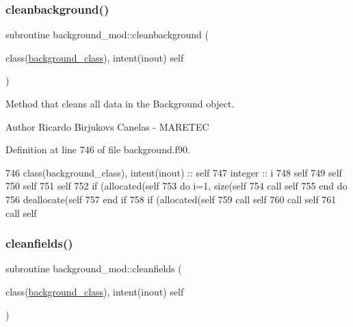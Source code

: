 \subsubsection{\texorpdfstring{cleanbackground()}{cleanbackground()}}
{\footnotesize\ttfamily subroutine background\+\_\+mod\+::cleanbackground (\begin{DoxyParamCaption}\item[{class(\mbox{\hyperlink{structbackground__mod_1_1background__class}{background\+\_\+class}}), intent(inout)}]{self }\end{DoxyParamCaption})\hspace{0.3cm}{\ttfamily [private]}}



Method that cleans all data in the Background object. 

\begin{DoxyAuthor}{Author}
Ricardo Birjukovs Canelas -\/ M\+A\+R\+E\+T\+EC 
\end{DoxyAuthor}


Definition at line 746 of file background.\+f90.


\begin{DoxyCode}
746     \textcolor{keywordtype}{class}(background\_class), \textcolor{keywordtype}{intent(inout)} :: self
747     \textcolor{keywordtype}{integer} :: i
748     self%
749     self%
750     self%
751     self%
752     \textcolor{keywordflow}{if} (\textcolor{keyword}{allocated}(self%
753         \textcolor{keywordflow}{do} i=1, \textcolor{keyword}{size}(self%
754             \textcolor{keyword}{call }self%
755 \textcolor{keywordflow}{        end do}
756         \textcolor{keyword}{deallocate}(self%
757 \textcolor{keywordflow}{    end if}
758     \textcolor{keywordflow}{if} (\textcolor{keyword}{allocated}(self%
759     \textcolor{keyword}{call }self%
760     \textcolor{keyword}{call }self%
761     \textcolor{keyword}{call }self%
\end{DoxyCode}
\mbox{\label{namespacebackground__mod_a843a471a68ce83809e3ed0a40886a4e7}} 
\subsubsection{\texorpdfstring{cleanfields()}{cleanfields()}}
{\footnotesize\ttfamily subroutine background\+\_\+mod\+::cleanfields (\begin{DoxyParamCaption}\item[{class(\mbox{\hyperlink{structbackground__mod_1_1background__class}{background\+\_\+class}}), intent(inout)}]{self }\end{DoxyParamCaption})\hspace{0.3cm}{\ttfamily [private]}}



